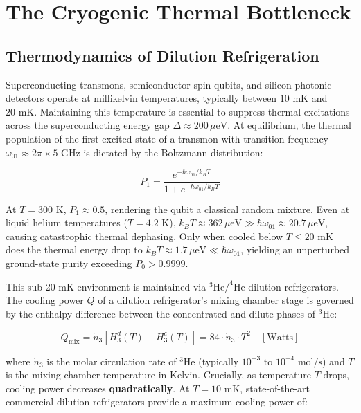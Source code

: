 \section{The Cryogenic Thermal Bottleneck}

\subsection{Thermodynamics of Dilution Refrigeration}
Superconducting transmons, semiconductor spin qubits, and silicon photonic detectors operate at millikelvin temperatures, typically between $10\text{ mK}$ and $20\text{ mK}$. Maintaining this temperature is essential to suppress thermal excitations across the superconducting energy gap $\Delta \approx 200\,\mu\text{eV}$. At equilibrium, the thermal population of the first excited state of a transmon with transition frequency $\omega_{01} \approx 2\pi \times 5\text{ GHz}$ is dictated by the Boltzmann distribution:

\begin{equation}
    P_1 = \frac{e^{-\hbar \omega_{01} / k_B T}}{1 + e^{-\hbar \omega_{01} / k_B T}}
\end{equation}

At $T = 300\text{ K}$, $P_1 \approx 0.5$, rendering the qubit a classical random mixture. Even at liquid helium temperatures ($T = 4.2\text{ K}$), $k_B T \approx 362\,\mu\text{eV} \gg \hbar \omega_{01} \approx 20.7\,\mu\text{eV}$, causing catastrophic thermal dephasing. Only when cooled below $T \le 20\text{ mK}$ does the thermal energy drop to $k_B T \approx 1.7\,\mu\text{eV} \ll \hbar \omega_{01}$, yielding an unperturbed ground-state purity exceeding $P_0 > 0.9999$.

This sub-20 mK environment is maintained via $^3\text{He}/^4\text{He}$ dilution refrigerators. The cooling power $\dot{Q}$ of a dilution refrigerator's mixing chamber stage is governed by the enthalpy difference between the concentrated and dilute phases of $^3\text{He}$:

\begin{equation}
    \dot{Q}_{\text{mix}} = \dot{n}_3 \left[ H_3^d(T) - H_3^c(T) \right] = 84 \cdot \dot{n}_3 \cdot T^2 \quad [\text{Watts}]
\end{equation}

where $\dot{n}_3$ is the molar circulation rate of $^3\text{He}$ (typically $10^{-3}\text{ to }10^{-4}\text{ mol/s}$) and $T$ is the mixing chamber temperature in Kelvin. Crucially, as temperature $T$ drops, cooling power decreases \textbf{quadratically}. At $T = 10\text{ mK}$, state-of-the-art commercial dilution refrigerators provide a maximum cooling power of:

